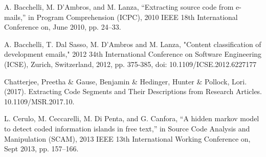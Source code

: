 \documentclass[12pt]{scrreprt}
\begin{document}
\begin{thebibliography}{9}

    A. Bacchelli, M. D’Ambros, and M. Lanza, “Extracting source code from e-mails,” in Program Comprehension (ICPC), 2010 IEEE 18th International Conference on, June 2010, pp. 24–33.

    A. Bacchelli, T. Dal Sasso, M. D'Ambros and M. Lanza, "Content classification of development emails," 2012 34th International Conference on Software Engineering (ICSE), Zurich, Switzerland, 2012, pp. 375-385, doi: 10.1109/ICSE.2012.6227177

    Chatterjee, Preetha \& Gause, Benjamin \& Hedinger, Hunter \& Pollock, Lori. (2017). Extracting Code Segments and Their Descriptions from Research Articles. 10.1109/MSR.2017.10. 

    L. Cerulo, M. Ceccarelli, M. Di Penta, and G. Canfora, “A hidden markov model to detect coded information islands in free text,” in Source Code Analysis and Manipulation (SCAM), 2013 IEEE 13th International Working Conference on, Sept 2013, pp. 157–166.

\end{thebibliography}
\end{document}
